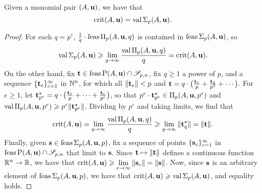 \documentclass[11pt]{amsart}
\begin{document}

\begin{proposition}  
Given a monomial pair $(A, \mathbf{u})$, we have that 
\[\operatorname{crit}(A,\mathbf{u}) = \operatorname{val}\Sigma_p(A,\mathbf{u}).\]
\end{proposition}

\begin{proof}
For each $q=p^e$,  $\frac{1}{q}\cdot\operatorname{feas}\Pi_p(A,\mathbf{u}, q)$ is contained in $\operatorname{feas} \Sigma_p(A,\mathbf{u})$, so 
\[
\operatorname{val}\Sigma_p(A,\mathbf{u}) \geqslant \displaystyle \lim_{q\to \infty}\frac{\operatorname{val}\Pi_p(A,\mathbf{u}, q)}{q} = \operatorname{crit}(A,\mathbf{u}).
 \]
On the other hand, fix $\mathbf{t} \in \operatorname{feas} \mathrm{P}(A, \mathbf{u}) \cap \mathscr{S}_{p,n}$, fix $q \geq 1$ a power of $p$, and a sequence $\{ \mathbf{t}_e \}_{e=1}^\infty$ in $\mathbb{N}^n$, for which all $\| \mathbf{t}_e \| < p$ and 
$\mathbf{t} = q \cdot \big( \frac{\mathbf{t}_1}{p} +\frac{\mathbf{t}_2}{p^2}+\cdots \big)$.  For $e \geq 1$, let 
 $\mathbf{t}^\star_{p^e} = q \cdot \big( \frac{\mathbf{t}_1}{p} + \cdots + \frac{\mathbf{t}_e}{p^e}  \big)$, so that $p^e \cdot \mathbf{t}^\star_{p^e} \in \Pi_p(A, \mathbf{u}, p^e)$ and $\operatorname{val} \Pi_p(A, \mathbf{u}, p^e) \geqslant p^e \| \mathbf{t}^\star_{p^e} \|$. 
 Dividing by $p^e$ and taking limits, we find that  
 \[
\operatorname{crit}(A,\mathbf{u}) = \lim_{q\to \infty} \frac{\operatorname{val} \Pi_p(A, \mathbf{u}, q)}{q} \geqslant \lim_{q \to \infty}   \| \mathbf{t}^\star_q \| = \| \mathbf{t} \|.
 \]
Finally, given $\mathbf{s} \in \operatorname{feas} \Sigma_p(A, \mathbf{u}, p)$, fix a sequence of points $\{ \mathbf{s}_e \}_{e=1}^\infty$ in $\operatorname{feas} \mathrm{P}(A, \mathbf{u}) \cap \mathscr{S}_{p,n}$ that limit to $\mathbf{s}$. Since $\mathbf{t} \mapsto \| \mathbf{t} \|$ defines a continuous function $\mathbb{R}^n \to \mathbb{R}$, we have that $\operatorname{crit}(A, \mathbf{u}) \geqslant \lim \limits_{e \to \infty} \|  \mathbf{s}_e  \| =  \|  \mathbf{s}  \|$.
Now, since $\mathbf{s}$ is an arbitrary element of $\operatorname{feas} \Sigma_p(A, \mathbf{u}, p)$, we have that
$\operatorname{crit}(A, \mathbf{u}) \geqslant \operatorname{val} \Sigma_p(A, \mathbf{u})$, and equality holds. 
\end{proof}
\end{document}
